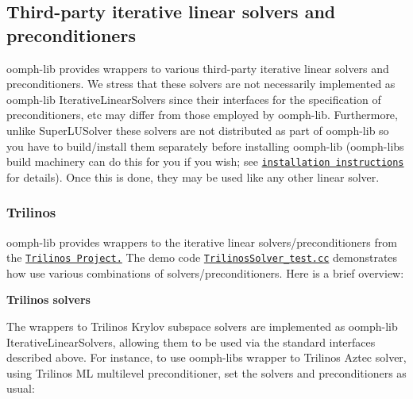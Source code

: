  

\hypertarget{index_third_party_iterative_linear_solvers}{}\subsection{Third-\/party iterative linear solvers and preconditioners}\label{index_third_party_iterative_linear_solvers}
{\ttfamily oomph-\/lib} provides wrappers to various third-\/party iterative linear solvers and preconditioners. We stress that these solvers are not necessarily implemented as {\ttfamily oomph-\/lib} {\ttfamily Iterative\+Linear\+Solvers} since their interfaces for the specification of preconditioners, etc may differ from those employed by {\ttfamily oomph-\/lib}. Furthermore, unlike {\ttfamily Super\+L\+U\+Solver} these solvers are not distributed as part of {\ttfamily oomph-\/lib} so you have to build/install them separately before installing {\ttfamily oomph-\/lib} ({\ttfamily oomph-\/lib\textquotesingle{}s} build machinery can do this for you if you wish; see \href{../../the_distribution/html/index.html#external_dist}{\tt installation instructions} for details). Once this is done, they may be used like any other linear solver.



\hypertarget{index_trilinos}{}\subsubsection{Trilinos}\label{index_trilinos}
{\ttfamily oomph-\/lib} provides wrappers to the iterative linear solvers/preconditioners from the \href{http://trilinos.sandia.gov/}{\tt Trilinos Project.} The demo code \href{../../../demo_drivers/linear_solvers/TrilinosSolver_test.cc}{\tt Trilinos\+Solver\+\_\+test.\+cc} demonstrates how use various combinations of solvers/preconditioners. Here is a brief overview\+:

{\bfseries Trilinos solvers}

The wrappers to Trilinos\textquotesingle{} Krylov subspace solvers are implemented as {\ttfamily oomph-\/lib} {\ttfamily Iterative\+Linear\+Solvers}, allowing them to be used via the standard interfaces described above. For instance, to use {\ttfamily oomph-\/lib\textquotesingle{}s} wrapper to {\ttfamily Trilinos\textquotesingle{}} Aztec solver, using {\ttfamily Trilinos\textquotesingle{}} {\ttfamily ML} multilevel preconditioner, set the solvers and preconditioners as usual\+:

